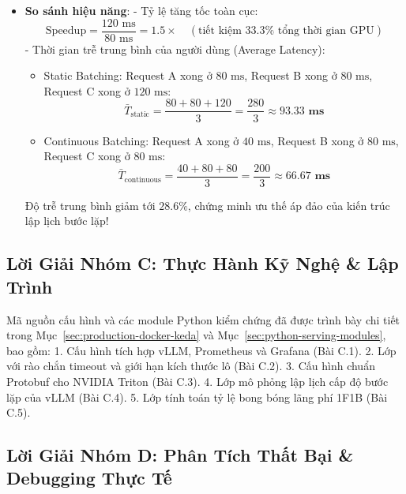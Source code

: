 \begin{itemize}
  \item[c)] \textbf{So sánh hiệu năng}:
  - Tỷ lệ tăng tốc toàn cục:
  \begin{equation*}
  \text{Speedup} = \frac{120\text{ ms}}{80\text{ ms}} = \mathbf{1.5\times} \quad (\text{tiết kiệm } 33.3\%\text{ tổng thời gian GPU})
  \end{equation*}
  - Thời gian trễ trung bình của người dùng (Average Latency):
  \begin{itemize}
    \item Static Batching: Request A xong ở $80\text{ ms}$, Request B xong ở $80\text{ ms}$, Request C xong ở $120\text{ ms}$:
    \begin{equation*}
    \bar{T}_{\text{static}} = \frac{80 + 80 + 120}{3} = \frac{280}{3} \approx \mathbf{93.33\text{ ms}}
    \end{equation*}
    \item Continuous Batching: Request A xong ở $40\text{ ms}$, Request B xong ở $80\text{ ms}$, Request C xong ở $80\text{ ms}$:
    \begin{equation*}
    \bar{T}_{\text{continuous}} = \frac{40 + 80 + 80}{3} = \frac{200}{3} \approx \mathbf{66.67\text{ ms}}
    \end{equation*}
  \end{itemize}
  Độ trễ trung bình giảm tới $\mathbf{28.6\%}$, chứng minh ưu thế áp đảo của kiến trúc lập lịch bước lặp!
\end{itemize}

\subsection{Lời Giải Nhóm C: Thực Hành Kỹ Nghệ \& Lập Trình}
Mã nguồn cấu hình và các module Python kiểm chứng đã được trình bày chi tiết trong Mục~\ref{sec:production-docker-keda} và Mục~\ref{sec:python-serving-modules}, bao gồm:
1. Cấu hình  tích hợp vLLM, Prometheus và Grafana (Bài C.1).
2. Lớp  với rào chắn timeout và giới hạn kích thước lô (Bài C.2).
3. Cấu hình chuẩn Protobuf  cho NVIDIA Triton (Bài C.3).
4. Lớp  mô phỏng lập lịch cấp độ bước lặp của vLLM (Bài C.4).
5. Lớp  tính toán tỷ lệ bong bóng lãng phí 1F1B (Bài C.5).

\subsection{Lời Giải Nhóm D: Phân Tích Thất Bại \& Debugging Thực Tế}

